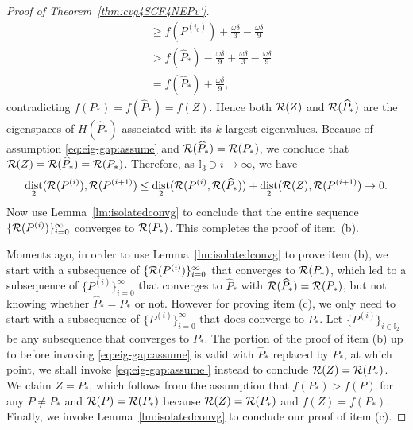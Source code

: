 \documentclass[11pt]{article}
\def\bbI{\mathbb{I}}
\def\cR{{\cal R}}
\def\what{\widehat}
\DeclareMathOperator{\dist}{dist}
\theoremstyle{definition}
\numberwithin{equation}{section}
\begin{document}
\begin{proof}[Proof of Theorem~\ref{thm:cvg4SCF4NEPv'}]
\begin{align*}
    &\ge f(P^{(i_0)})+\frac {\omega\delta}3-\frac {\omega\delta}9 \\
    &> f(\what P_*)-\frac {\omega\delta}9+\frac {\omega\delta}3-\frac {\omega\delta}9 \\
    &=f(\what P_*)+\frac {\omega\delta}9,
\end{align*}
contradicting $f(P_*)=f(\what P_*)=f(Z)$.
Hence both $\cR(Z)$ and $\cR(\what P_*)$ are the eigenspaces of $H(\what P_*)$ associated with its $k$ largest eigenvalues.
Because of assumption \eqref{eq:eig-gap:assume} and $\cR(\what P_*)=\cR(P_*)$, we conclude that $\cR(Z)=\cR(\what P_*)=\cR(P_*)$.
Therefore, as $\bbI_3\ni i\to\infty$, we have
$$
\dist_2(\cR(P^{(i)}),\cR(P^{(i+1)})\le\dist_2(\cR(P^{(i)},\cR(\what P_*))+\dist_2(\cR(Z),\cR(P^{(i+1)})\to 0.
$$
Now use Lemma~\ref{lm:isolatedconvg} to conclude that the entire sequence
$\{\cR(P^{(i)})\}_{i=0}^{\infty}$ converges to $\cR(P_*)$. This completes the proof of item~(b).

Moments ago, in order to use Lemma~\ref{lm:isolatedconvg} to prove item (b), we start with a subsequence of $\{\cR(P^{(i)})\}_{i=0}^{\infty}$ that converges to $\cR(P_*)$, which led to a subsequence of
$\{P^{(i)}\}_{i=0}^{\infty}$ that converges to $\what P_*$ with $\cR(\what P_*)=\cR(P_*)$,
but not knowing whether $\what P_*= P_*$ or not.
However for proving item (c), we only need to start with a subsequence of $\{P^{(i)}\}_{i=0}^{\infty}$ that does converge
to $P_*$. Let $\{P^{(i)}\}_{i\in\bbI_2}$ be any subsequence that converges to $P_*$.
The portion of the proof of item (b) up to
before invoking \eqref{eq:eig-gap:assume} is valid with $\what P_*$ replaced by $P_*$, at which point, we shall invoke
\eqref{eq:eig-gap:assume'} instead to conclude $\cR(Z)=\cR(P_*)$.
We claim $Z=P_*$, which follows from the assumption
that $f(P_*)>f(P)$ for any $P\ne P_*$ and $\cR(P)=\cR(P_*)$ because $\cR(Z)=\cR(P_*)$ and $f(Z)=f(P_*)$.
Finally, we invoke Lemma~\ref{lm:isolatedconvg} to conclude our proof of item (c).


\end{proof}
\end{document}
